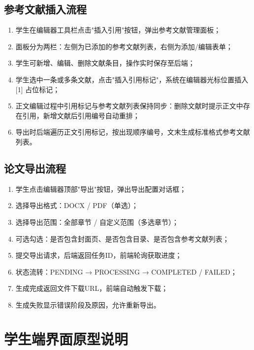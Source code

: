 \documentclass{../../softeng}
\begin{document}
\subsection{参考文献插入流程}

\begin{enumerate}
    \item 学生在编辑器工具栏点击"插入引用"按钮，弹出参考文献管理面板；
    \item 面板分为两栏：左侧为已添加的参考文献列表，右侧为添加/编辑表单；
    \item 学生可新增、编辑、删除文献条目，操作实时保存至后端；
    \item 学生选中一条或多条文献，点击"插入引用标记"，系统在编辑器光标位置插入 [1] 占位标记；
    \item 正文编辑过程中引用标记与参考文献列表保持同步：删除文献时提示正文中存在引用，新增文献后引用编号自动重排；
    \item 导出时后端遍历正文引用标记，按出现顺序编号，文末生成标准格式参考文献列表。
\end{enumerate}

\subsection{论文导出流程}

\begin{enumerate}
    \item 学生点击编辑器顶部"导出"按钮，弹出导出配置对话框；
    \item 选择导出格式：DOCX / PDF（单选）；
    \item 选择导出范围：全部章节 / 自定义范围（多选章节）；
    \item 可选勾选：是否包含封面页、是否包含目录、是否包含参考文献列表；
    \item 提交导出请求，后端返回任务ID，前端轮询获取进度；
    \item 状态流转：PENDING → PROCESSING → COMPLETED / FAILED；
    \item 生成完成返回文件下载URL，前端自动触发下载；
    \item 生成失败显示错误阶段及原因，允许重新导出。
\end{enumerate}

\section{学生端界面原型说明}
\end{document}

